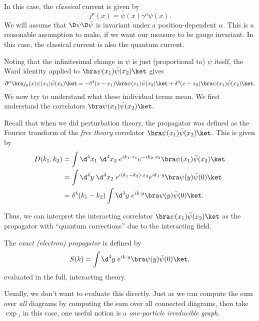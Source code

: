 \documentclass[a4paper]{article}
\begin{document}
In this case, the \emph{classical} current is given by
\[
  j^\mu (x) = \bar\psi (x) \gamma^\mu \psi(x).
\]
We will assume that $\D \psi \D \bar{\psi}$ is invariant under a position-dependent $\alpha$. This is a reasonable assumption to make, if we want our measure to be gauge invariant. In this case, the classical current is also the quantum current.

Noting that the infinitesimal change in $\psi$ is just (proportional to) $\psi$ itself, the Ward identity applied to $\bra\psi(x_1) \bar\psi(x_2)\ket$ gives
\[
  \partial^\mu \bra j_\mu(x) \psi(x_1) \bar\psi(x_2)\ket = - \delta^4(x - x_1) \bra \psi(x_1) \bar\psi(x_2)\ket + \delta^4(x - x_2) \bra \psi(x_1) \bar\psi(x_2)\ket.
\]
We now try to understand what these individual terms mean. We first understand the correlators $\bra \psi(x_1) \bar\psi(x_2)\ket$.

Recall that when we did perturbation theory, the propagator was defined as the Fourier transform of the \emph{free theory} correlator $\bra \psi(x_1) \bar\psi(x_2)\ket$. This is given by
\begin{align*}
  D(k_1, k_2) &= \int \d^4 x_1 \; \d^4 x_2\; e^{ik_1 \cdot x_1} e^{-ik_2 \cdot x_2} \bra \psi(x_1) \bar\psi(x_2)\ket\\
  &= \int \d^4 y \;\d^4 x_2\; e^{i(k_1 - k_2) \cdot x_2} e^{ik_1 \cdot y} \bra \psi(y) \bar\psi(0)\ket\\
  &= \delta^4(k_1 - k_2) \int \d^4 y\; e^{ik\cdot y} \bra \psi(y) \bar\psi(0)\ket.
\end{align*}

Thus, we can interpret the interacting correlator $\bra \psi(x_1) \bar\psi(x_2)\ket$ as the propagator with ``quantum corrections'' due to the interacting field.
\begin{defi}
  The \emph{exact (electron) propagator} is defined by
  \[
    S(k) = \int \d^4 y\; e^{ik\cdot y} \bra \psi(y) \bar\psi(0)\ket,
  \]
  evaluated in the full, interacting theory.
\end{defi}

Usually, we don't want to evaluate this directly. Just as we can compute the sum over \emph{all} diagrams by computing the sum over all connected diagrams, then take $\exp$, in this case, one useful notion is a \emph{one-particle irreducible graph}.
\end{document}
